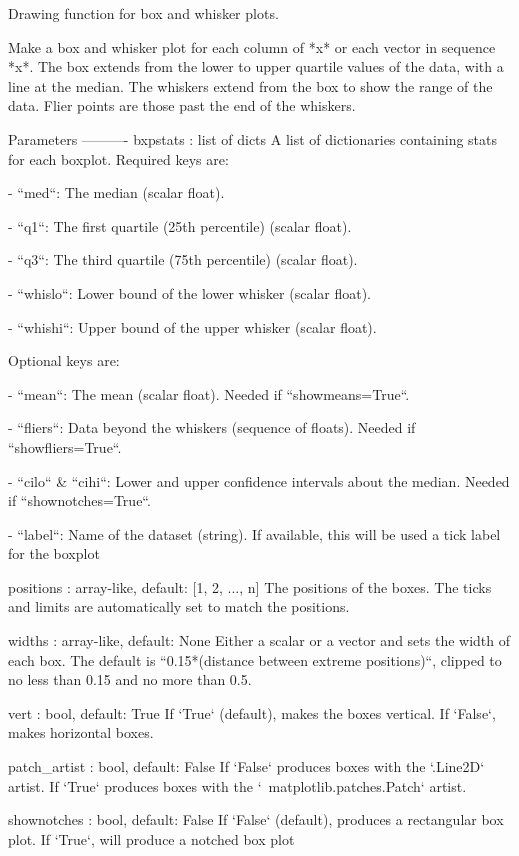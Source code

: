 \begin{DoxyVerb}Drawing function for box and whisker plots.

Make a box and whisker plot for each column of *x* or each
vector in sequence *x*.  The box extends from the lower to
upper quartile values of the data, with a line at the median.
The whiskers extend from the box to show the range of the
data.  Flier points are those past the end of the whiskers.

Parameters
----------
bxpstats : list of dicts
  A list of dictionaries containing stats for each boxplot.
  Required keys are:

  - ``med``: The median (scalar float).

  - ``q1``: The first quartile (25th percentile) (scalar
    float).

  - ``q3``: The third quartile (75th percentile) (scalar
    float).

  - ``whislo``: Lower bound of the lower whisker (scalar
    float).

  - ``whishi``: Upper bound of the upper whisker (scalar
    float).

  Optional keys are:

  - ``mean``: The mean (scalar float). Needed if
    ``showmeans=True``.

  - ``fliers``: Data beyond the whiskers (sequence of floats).
    Needed if ``showfliers=True``.

  - ``cilo`` & ``cihi``: Lower and upper confidence intervals
    about the median. Needed if ``shownotches=True``.

  - ``label``: Name of the dataset (string). If available,
    this will be used a tick label for the boxplot

positions : array-like, default: [1, 2, ..., n]
  The positions of the boxes. The ticks and limits
  are automatically set to match the positions.

widths : array-like, default: None
  Either a scalar or a vector and sets the width of each
  box. The default is ``0.15*(distance between extreme
  positions)``, clipped to no less than 0.15 and no more than
  0.5.

vert : bool, default: True
  If `True` (default), makes the boxes vertical.  If `False`,
  makes horizontal boxes.

patch_artist : bool, default: False
  If `False` produces boxes with the `.Line2D` artist.
  If `True` produces boxes with the `~matplotlib.patches.Patch` artist.

shownotches : bool, default: False
  If `False` (default), produces a rectangular box plot.
  If `True`, will produce a notched box plot


\end{DoxyVerb}
